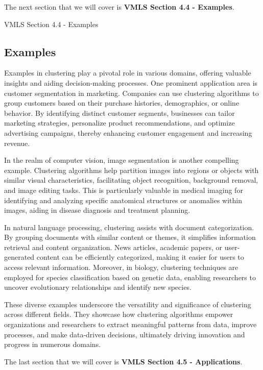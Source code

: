 The next section that we will cover is \textbf{VMLS Section 4.4 - Examples}.

\begin{notes}{VMLS Section 4.4 - Examples}
    \subsection*{Examples}

    Examples in clustering play a pivotal role in various domains, offering valuable insights and aiding decision-making processes. One prominent application area is customer segmentation in marketing. Companies can use 
    clustering algorithms to group customers based on their purchase histories, demographics, or online behavior. By identifying distinct customer segments, businesses can tailor marketing strategies, personalize product 
    recommendations, and optimize advertising campaigns, thereby enhancing customer engagement and increasing revenue.

    In the realm of computer vision, image segmentation is another compelling example. Clustering algorithms help partition images into regions or objects with similar visual characteristics, facilitating object recognition, 
    background removal, and image editing tasks. This is particularly valuable in medical imaging for identifying and analyzing specific anatomical structures or anomalies within images, aiding in disease diagnosis and 
    treatment planning.
    
    In natural language processing, clustering assists with document categorization. By grouping documents with similar content or themes, it simplifies information retrieval and content organization. News articles, academic 
    papers, or user-generated content can be efficiently categorized, making it easier for users to access relevant information. Moreover, in biology, clustering techniques are employed for species classification based on 
    genetic data, enabling researchers to uncover evolutionary relationships and identify new species.
    
    These diverse examples underscore the versatility and significance of clustering across different fields. They showcase how clustering algorithms empower organizations and researchers to extract meaningful patterns from 
    data, improve processes, and make data-driven decisions, ultimately driving innovation and progress in numerous domains.
\end{notes}

The last section that we will cover is \textbf{VMLS Section 4.5 - Applications}.


